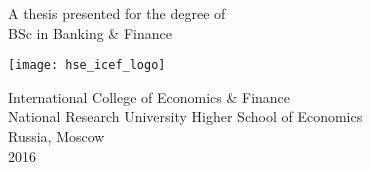 \begin{titlepage}
    \begin{center}
        \vspace*{1cm}
        
        \Huge
        \textbf{\theme}
        
        \vspace{0.5cm}
        \LARGE
        
        \vspace{1.5cm}
        
        \textbf{\auth}
        
        \vspace{3cm}
        
        A thesis presented for the degree of\\
        BSc in Banking \& Finance
        
        \vspace{0.8cm}
        
        \texttt{[image: hse\_icef\_logo]}
        
        \Large
        International College of Economics \& Finance\\
        National Research University Higher School of Economics\\
        Russia, Moscow\\
        2016
        
    \end{center}
\end{titlepage}
